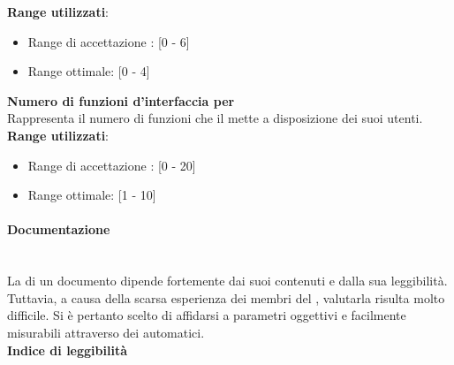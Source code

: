 \textbf{Range utilizzati}:
\begin{itemize}
	\item Range di accettazione : [0 - 6]
	\item Range ottimale: [0 - 4]
\end{itemize}

\textbf{Numero di funzioni d'interfaccia per }\\

Rappresenta il numero di funzioni che il  mette a disposizione dei suoi utenti. \\

\textbf{Range utilizzati}:
\begin{itemize}
	\item Range di accettazione : [0 - 20]
	\item Range ottimale: [1 - 10]
\end{itemize}

\paragraph{Documentazione}\mbox{}\\
\hypertarget{metriche_documenti}{}
La  di un documento dipende fortemente dai suoi contenuti e dalla sua leggibilità. Tuttavia, a causa della scarsa esperienza dei membri del , valutarla risulta molto difficile. Si è pertanto scelto di affidarsi a parametri oggettivi e facilmente misurabili attraverso dei  automatici.\\

\textbf{Indice di leggibilità}\\


